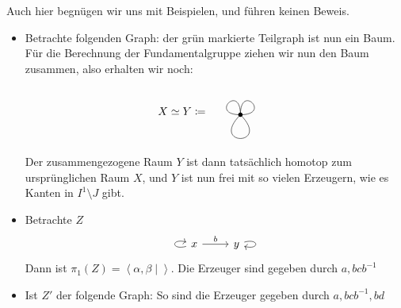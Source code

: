 \begin{oral}
    Auch hier begnügen wir uns mit Beispielen, und führen keinen Beweis.
\end{oral}

\begin{example}
    \begin{itemize}
        \item 
    Betrachte folgenden Graph:
    der grün markierte Teilgraph ist nun ein Baum. Für die Berechnung der Fundamentalgruppe ziehen wir nun den Baum zusammen, also erhalten wir noch:
    \[
       X \simeq Y \coloneqq 
       \begin{tikzpicture}[baseline = -0.2]
        \fill (0,0) circle (2pt);
        \draw (0,0) .. controls (1,0) and (0,1) .. (0,0);
        \draw (0,0) .. controls (0,1) and (-1,0) .. (0,0);
        \draw (0,0) .. controls (-1,-1) and (1,-1) .. (0,0);
    \end{tikzpicture}
\]
Der zusammengezogene Raum $Y$ ist dann tatsächlich homotop zum ursprünglichen Raum $X$, und  $Y$ ist nun frei mit so vielen Erzeugern, wie es Kanten in  $I^1 \setminus J$ gibt.
\item Betrachte  $Z$
    \[
    \begin{tikzcd}
        \arrow[loop left]{a} \ar{r}{b} x & y \ar[loop right]{c}
    \end{tikzcd}
\]
Dann ist $\pi_1(Z) = \left< α,β \mid  \right> $. Die Erzeuger sind gegeben durch $a, bcb^{-1}$
\item Ist $Z'$ der folgende Graph:
    So sind die Erzeuger gegeben durch $a,bc b^{-1}, bd$
    \end{itemize}
\end{example}
